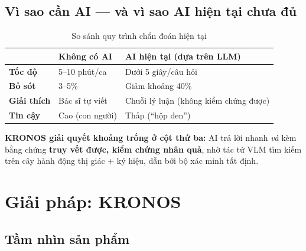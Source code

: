 \documentclass[11pt,a4paper]{article}
\begin{document}
\subsection{Vì sao cần AI --- và vì sao AI hiện tại chưa đủ}

\begin{table}[H]
\centering\small
\begin{tabularx}{\textwidth}{>{\bfseries}l X X}
\toprule
& \textbf{Không có AI} & \textbf{AI hiện tại (dựa trên LLM)} \\
\midrule
Tốc độ    & 5--10 phút/ca & Dưới 5 giây/câu hỏi \\
Bỏ sót    & 3--5\%        & Giảm khoảng 40\% \\
Giải thích & Bác sĩ tự viết & Chuỗi lý luận (không kiểm chứng được) \\
Tin cậy    & Cao (con người) & Thấp (``hộp đen'') \\
\bottomrule
\end{tabularx}
\caption{So sánh quy trình chẩn đoán hiện tại}
\end{table}

\textbf{KRONOS giải quyết khoảng trống ở cột thứ ba:} AI trả lời nhanh \emph{và} kèm bằng chứng \textbf{truy vết được, kiểm chứng nhân quả}, nhờ tác tử VLM tìm kiếm trên cây hành động thị giác + ký hiệu, dẫn bởi bộ xác minh tất định.

\section{Giải pháp: KRONOS}

\subsection{Tầm nhìn sản phẩm}
\end{document}

